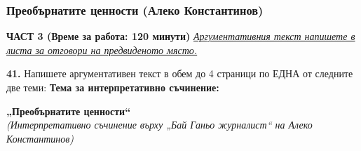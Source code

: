 \documentclass[12pt,a4paper]{article}
\begin{document}
\subsubsection{Преобърнатите ценности (Алеко Константинов)}
\vspace{0.5cm}
\begin{center}
\textbf{ЧАСТ 3 (Време за работа: 120 минути)}
\vspace{0.2cm}
{\textit{\underline{Аргументативния текст напишете в листа за отговори на предвиденото място.}}}
\vspace{0.1cm}
\end{center}
\textbf{41.} Напишете аргументативен текст в обем до 4 страници по ЕДНА от следните две теми:
\vspace{0.2cm}
\textbf{Тема за интерпретативно съчинение:}
\vspace{0.1cm}
\begin{center}
\textbf{„Преобърнатите ценности“}
\\
\textit{(Интерпретативно съчинение върху „Бай Ганьо журналист“ на Алеко Константинов)}
\end{center}
\end{document}
